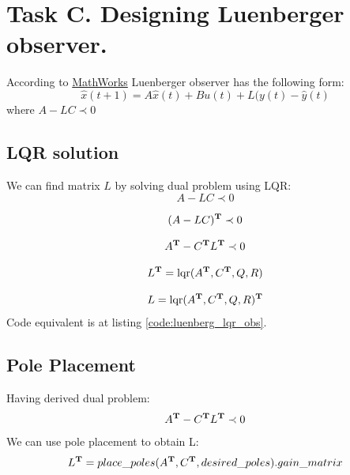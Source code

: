 \documentclass[12pt,letterpaper]{article}
\begin{document}
\section*{Task C. Designing Luenberger observer.}
\label{Q:C}
    According to \href{https://www.mathworks.com/help/physmod/sps/ref/luenbergerobserver.html}{MathWorks} Luenberger observer has the following form:
    \begin{equation*}
        \hat x(t+1) = A \hat x(t) + Bu(t) + L( y(t) - \hat y(t)
    \end{equation*}
    where $A - LC \prec 0$
    
    \subsection*{LQR solution}
        We can find matrix $L$ by solving dual problem using LQR:
        \begin{equation*}
            A - LC \prec 0
        \end{equation*}
        
        \begin{equation*}
            (A-LC)^\mathbf{T} \prec 0
        \end{equation*}
        
        \begin{equation*}
            A^\mathbf{T}-C^\mathbf{T} L^\mathbf{T} \prec 0
        \end{equation*}
        
        \begin{equation*}
            L^\mathbf{T} = \text{lqr}(A^\mathbf{T}, C^\mathbf{T}, Q, R)
        \end{equation*}
        
        \begin{equation*}
             L = \text{lqr}(A^\mathbf{T}, C^\mathbf{T}, Q, R)^\mathbf{T}
        \end{equation*}
        Code equivalent is at listing \ref{code:luenberg_lqr_obs}.
        
        
    \subsection*{Pole Placement}
        Having derived dual problem:
        \begin{equation*}
            A^\mathbf{T}-C^\mathbf{T} L^\mathbf{T} \prec 0
        \end{equation*}
        We can use pole placement to obtain L:
        \begin{equation*}
            L^\mathbf{T} = place\_poles(A^\mathbf{T}, C^\mathbf{T}, desired\_poles).gain\_matrix
        \end{equation*}
        
\end{document}
